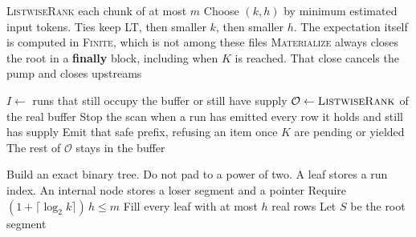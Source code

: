 \begin{algorithm}[H]
\caption{Semantic ORDER BY.}
\label{alg:orderby}
\textsc{ListwiseRank} each chunk of at most $m$\;
Choose $(k,h)$ by minimum estimated input tokens.
Ties keep LT, then smaller $k$, then smaller $h$.
The expectation itself is computed in \textsc{Finite}, which is not among these files\;
\textsc{Materialize} always closes the root in a \textbf{finally} block, including when $K$ is reached. That close cancels the pump and closes upstreams\;
\end{algorithm}

\begin{algorithm}[H]
\caption{One sliding-window round. $I$ is a set of run indexes.}
\label{alg:sw}
$I\leftarrow$ runs that still occupy the buffer or still have supply\;
$\mathcal{O}\leftarrow\textsc{ListwiseRank}$ of the real buffer\;
Stop the scan when a run has emitted every row it holds and still has supply\;
Emit that safe prefix, refusing an item once $K$ are pending or yielded\;
The rest of $\mathcal{O}$ stays in the buffer\;
\end{algorithm}

\begin{algorithm}[H]
\caption{Pointer-guided LT. One generator for every $h\ge 1$.}
\label{alg:lt}
Build an exact binary tree. Do not pad to a power of two.
A leaf stores a run index. An internal node stores a loser segment and a pointer\;
Require $(1+\lceil\log_2 k\rceil)\,h\le m$\;
Fill every leaf with at most $h$ real rows\;
Let $S$ be the root segment\;
\end{algorithm}

